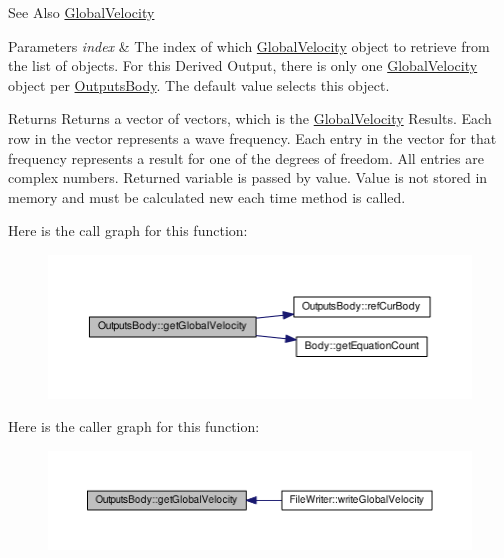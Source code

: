 \begin{DoxySeeAlso}{See Also}
\hyperlink{class_global_velocity}{Global\-Velocity} 
\end{DoxySeeAlso}

\begin{DoxyParams}{Parameters}
{\em index} & The index of which \hyperlink{class_global_velocity}{Global\-Velocity} object to retrieve from the list of objects. For this Derived Output, there is only one \hyperlink{class_global_velocity}{Global\-Velocity} object per \hyperlink{class_outputs_body}{Outputs\-Body}. The default value selects this object. \\
\hline
\end{DoxyParams}
\begin{DoxyReturn}{Returns}
Returns a vector of vectors, which is the \hyperlink{class_global_velocity}{Global\-Velocity} Results. Each row in the vector represents a wave frequency. Each entry in the vector for that frequency represents a result for one of the degrees of freedom. All entries are complex numbers. Returned variable is passed by value. Value is not stored in memory and must be calculated new each time method is called. 
\end{DoxyReturn}


Here is the call graph for this function\-:\nopagebreak
\begin{figure}[H]
\begin{center}
\leavevmode
\includegraphics[width=350pt]{class_outputs_body_a16d63ba2343caa9244a461fb3d539843_cgraph}
\end{center}
\end{figure}




Here is the caller graph for this function\-:\nopagebreak
\begin{figure}[H]
\begin{center}
\leavevmode
\includegraphics[width=350pt]{class_outputs_body_a16d63ba2343caa9244a461fb3d539843_icgraph}
\end{center}
\end{figure}


